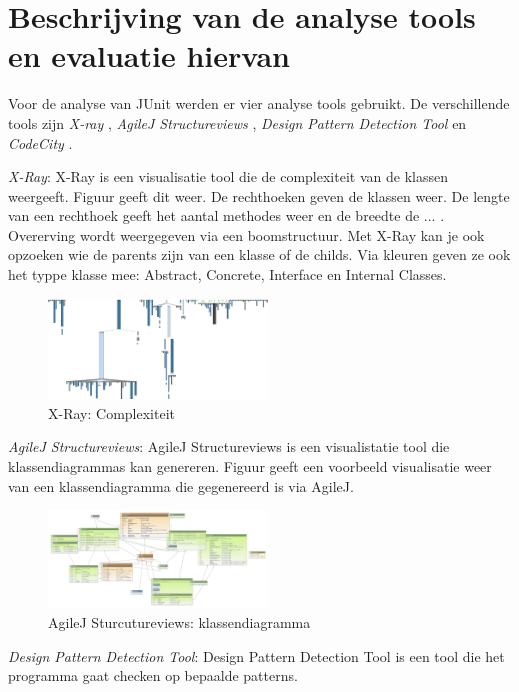 \documentclass[a4paper, 11pt]{article}
\begin{document}
\section{Beschrijving van de analyse tools en evaluatie hiervan}

Voor de analyse van JUnit werden er vier analyse tools gebruikt. De verschillende tools zijn \textit{X-ray} \cite{X-Ray}, \textit{AgileJ Structureviews} \cite{AgileJ Structureviews}, \textit{Design Pattern Detection Tool} \cite{Design Pattern Detection Tool} en \textit{CodeCity} \cite{CodeCity}.

\begin{description}

\item \textit{X-Ray}: X-Ray is een visualisatie tool die de complexiteit van de klassen weergeeft. Figuur \label{fig:X-Ray} geeft dit weer. De rechthoeken geven de klassen weer. De lengte van een rechthoek geeft het aantal methodes weer en de breedte de  ... . Overerving wordt weergegeven via een boomstructuur. Met X-Ray kan je ook opzoeken wie de parents zijn van een klasse of de childs. Via kleuren geven ze ook het typpe klasse mee: Abstract, Concrete, Interface en Internal Classes. 

\begin{figure}[hb!]
	\centering
	\includegraphics[width=0.52\textwidth]{XRayComplexity}
	\caption{X-Ray: Complexiteit}
	\label{fig:X-Ray}
\end{figure}

\item \textit{AgileJ Structureviews}: AgileJ Structureviews is een visualistatie tool die klassendiagrammas kan genereren. Figuur \label{fig:AgileJklassendia} geeft een voorbeeld visualisatie weer van een klassendiagramma die gegenereerd is via AgileJ.


\begin{figure}[hb!]
	\centering
	\includegraphics[width=0.52\textwidth]{AgileJKlassendiagramma}
	\caption{AgileJ Sturcutureviews: klassendiagramma}
	\label{fig:AgileJKlassendia}
\end{figure}

\item \textit{Design Pattern Detection Tool}: Design Pattern Detection Tool is een tool die het programma gaat checken op bepaalde patterns.

\end{description}
\end{document}
